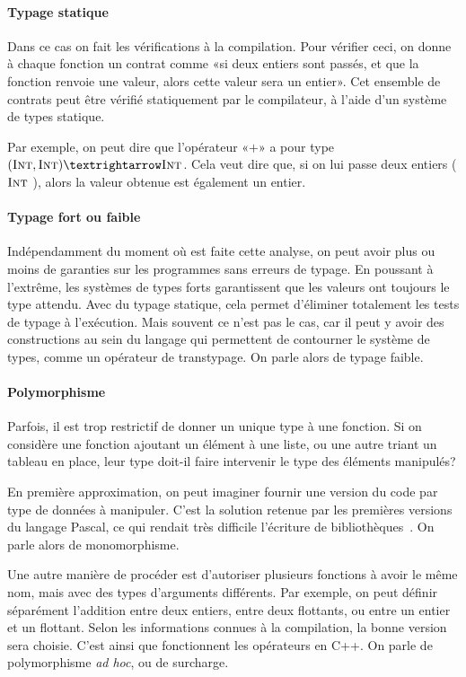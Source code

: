 \paragraph{Typage statique}

Dans ce cas on fait les vérifications à la compilation. Pour vérifier ceci, on
donne à chaque fonction un contrat comme «si deux entiers sont passés, et que
la fonction renvoie une valeur, alors cette valeur sera un entier». Cet
ensemble de contrats peut être vérifié statiquement par le compilateur, à l'aide
d'un système de types statique.

Par exemple, on peut dire que l'opérateur «$+$» a pour type $(\tInt, \tInt) →
\tInt$. Cela veut dire que, si on lui passe deux entiers ($\textsc{Int}$ \tInt), alors
la valeur obtenue est également un entier.

\paragraph{Typage fort ou faible}

Indépendamment du moment où est faite cette analyse, on peut avoir plus ou moins
de garanties sur les programmes sans erreurs de typage. En poussant à l'extrême,
les systèmes de types forts garantissent que les valeurs ont toujours le type
attendu. Avec du typage statique, cela permet d'éliminer totalement les tests de
typage à l'exécution. Mais souvent ce n'est pas le cas, car il peut y avoir des
constructions au sein du langage qui permettent de contourner le système de
types, comme un opérateur de transtypage. On parle alors de typage faible.

\paragraph{Polymorphisme}

Parfois, il est trop restrictif de donner un unique type à une fonction. Si on
considère une fonction ajoutant un élément à une liste, ou une autre
triant un tableau en place, leur type doit-il faire intervenir le type des
éléments manipulés?

En première approximation, on peut imaginer fournir une version du code par type
de données à manipuler. C'est la solution retenue par les premières versions du
langage Pascal, ce qui rendait très difficile l'écriture de
bibliothèques~\cite{PascalNoEscape}. On parle alors de monomorphisme.

Une autre manière de procéder est d'autoriser plusieurs fonctions à avoir le
même nom, mais avec des types d'arguments différents. Par exemple, on peut
définir séparément l'addition entre deux entiers, entre deux flottants, ou entre
un entier et un flottant. Selon les informations connues à la compilation, la
bonne version sera choisie. C'est ainsi que fonctionnent les opérateurs en C++.
On parle de polymorphisme \emph{ad hoc}, ou de surcharge.

